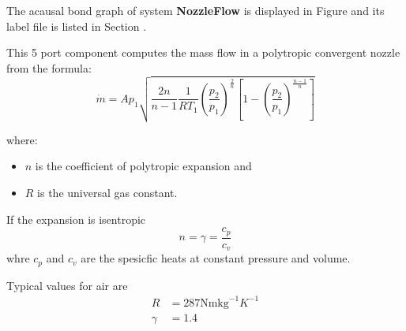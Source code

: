 

   The acausal bond graph of system \textbf{NozzleFlow} is
   displayed in Figure  and its label
   file is listed in Section .

This 5 port component computes the mass flow in a polytropic
convergent nozzle from the formula:
\begin{equation}
  \dot m = A p_1 \sqrt{\frac{2n}{n-1}\frac{1}{RT_1} 
   \left ( \frac{p_2}{p_1} \right )^\frac{2}{n}
    \left [ 1- \left ( \frac{p_2}{p_1} \right )^\frac{n-1}{n} \right ]  }
\end{equation}

where:
\begin{itemize}
\item $n$ is the coefficient of polytropic expansion and
\item $R$ is the universal gas constant.
\end{itemize}

If the expansion is isentropic
\begin{equation}
  n=\gamma=\frac{c_p}{c_v}
\end{equation}
whre $c_p$ and $c_v$ are the spesicfic heats at constant pressure and volume.

Typical values for air are 
\begin{equation}
  \begin{align}
    R &= 287 \text{Nm}\text{kg}^{-1}{K}^{-1}\\
    \gamma &= 1.4
  \end{align}
\end{equation}